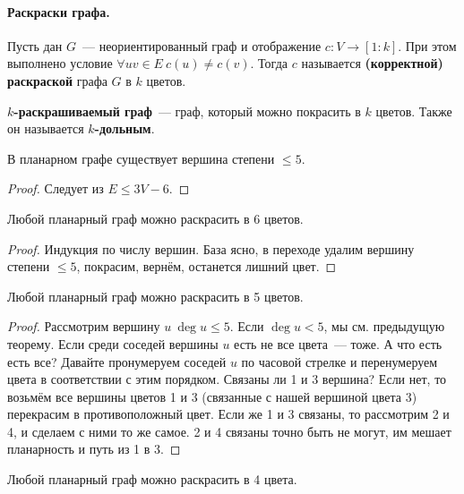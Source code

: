 \documentclass{article}
\begin{document}
    \paragraph{Раскраски графа.}
    \begin{definition}
        Пусть дан $G$~--- неориентированный граф и отображение $c\colon V\to[1:k]$. При этом выполнено условие $\forall uv\in E~c(u)\neq c(v)$. Тогда $c$ называется \textbf{(корректной) раскраской} графа $G$ в $k$ цветов.
    \end{definition}
    \begin{definition}
        \textbf{$k$-раскрашиваемый граф}~--- граф, который можно покрасить в $k$ цветов. Также он называется \textbf{$k$-дольным}.
    \end{definition}
    \begin{claim}
        В планарном графе существует вершина степени $\leqslant 5$.
    \end{claim}
    \begin{proof}
        Следует из $E\leqslant 3V-6$.
    \end{proof}
    \begin{theorem}
        Любой планарный граф можно раскрасить в 6 цветов.
    \end{theorem}
    \begin{proof}
        Индукция по числу вершин. База ясно, в переходе удалим вершину степени $\leqslant 5$, покрасим, вернём, останется лишний цвет.
    \end{proof}
    \begin{theorem}
        Любой планарный граф можно раскрасить в 5 цветов.
    \end{theorem}
    \begin{proof}
        Рассмотрим вершину $u~\deg u\leqslant5$. Если $\deg u<5$, мы см. предыдущую теорему. Если среди соседей вершины $u$ есть не все цвета~--- тоже. А что есть есть все? Давайте пронумеруем соседей $u$ по часовой стрелке и перенумеруем цвета в соответствии с этим порядком. Связаны ли 1 и 3 вершина? Если нет, то возьмём все вершины цветов 1 и 3 (связанные с нашей вершиной цвета 3) перекрасим в противоположный цвет. Если же 1 и 3 связаны, то рассмотрим 2 и 4, и сделаем с ними то же самое. 2 и 4 связаны точно быть не могут, им мешает планарность и путь из 1 в 3.
    \end{proof}
    \begin{theorem}
        Любой планарный граф можно раскрасить в 4 цвета.
    \end{theorem}
\end{document}
